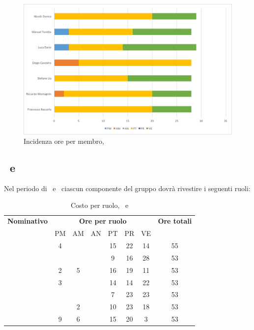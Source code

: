 \begin{figure}[H]
	\centering 
	\includegraphics[scale=0.7]{Immagini/GraficiPianoLavoro/PA.png}
	\caption{Incidenza ore per membro, \PA}
\end{figure}

\newpage
\subsection{\PD\ e \COD}
Nel periodo di \PD\ e \COD\ ciascun componente del gruppo dovrà rivestire i seguenti ruoli:

\begin{table}[h]
	\begin{center}
		\begin{tabular}{|c|c|c|c|c|c|c|c|}
			\hline
			\textbf{Nominativo} & \multicolumn{6}{c|}{\textbf{Ore per ruolo}} & \textbf{Ore totali} \\
					& PM & AM & AN & PT & PR & VE & \\
			\hline
			\FB		& 4  &	  &   & 15	&	22 & 14  &	55	\\
			\hline
			\RM		&	 &	  &	   & 9	&	16 & 28 & 53	\\
			\hline
			\SL		& 2	 & 5  &	   & 16	&	19 & 11  &	53	\\
			\hline
			\DC		& 3	 &	  &	   & 14	&	14 & 22 &	53	\\
			\hline
			\LD 	&	 &	  &	   & 7	&	23 & 23  &	53	\\
			\hline
			\MT		& 	 & 2  &	   & 10	&	23 & 18  &	53	\\
			\hline
			\ND 	& 9 & 6  &	   & 15	&	20 & 3 & 53	\\
			\hline
		\end{tabular}
	\end{center}
	\caption{Costo per ruolo, \PD\ e \COD}
\end{table}

